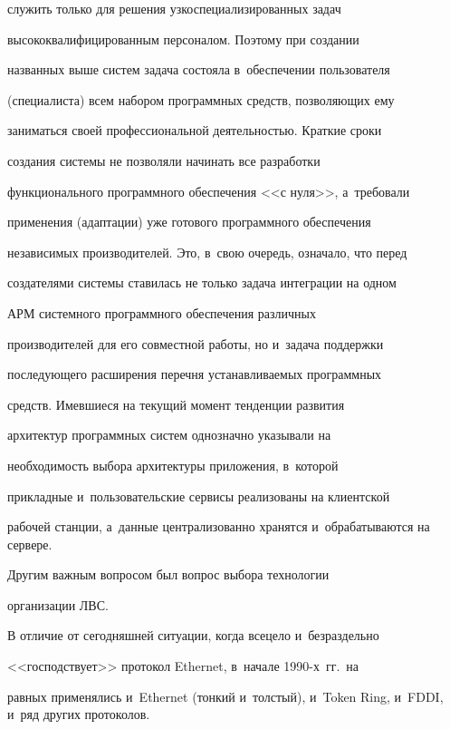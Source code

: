 служить только для решения узкоспециализированных задач


высококвалифицированным персоналом. Поэтому при создании


названных выше систем задача состояла в~обеспечении пользователя


(специалиста) всем набором программных средств, позволяющих ему


заниматься своей профессиональной деятельностью. Краткие сроки


создания системы не позволяли начинать все разработки


функционального программного обеспечения <<с нуля>>, а~требовали


применения (адаптации) уже готового программного обеспечения


независимых производителей. Это, в~свою очередь, означало, что перед


создателями системы ставилась не только задача интеграции на одном


АРМ системного программного обеспечения различных


производителей для его совместной работы, но и~задача поддержки


последующего расширения перечня устанавливаемых программных


средств. Имевшиеся на текущий момент тенденции развития


архитектур программных сис\-тем однозначно указывали на


необходимость выбора архитектуры приложения, в~которой


прикладные и~пользовательские сервисы реализованы на клиентской


рабочей станции, а~данные централизованно хранятся и~обрабатываются на сервере.


{





}





     Другим важным вопросом был вопрос выбора технологии


организации ЛВС.





     В отличие от сегодняшней ситуации, когда всецело и~безраздельно


     <<господствует>> протокол Ethernet, в~начале 1990-х~гг.\ на


равных применялись и~Ethernet (тонкий и~толстый), и~Token Ring, и~FDDI, и~ряд других протоколов.





